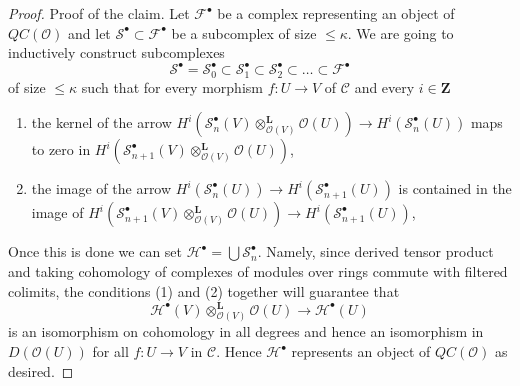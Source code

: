 \begin{proof}
\medskip\noindent
Proof of the claim. Let $\mathcal{F}^\bullet$ be a complex representing
an object of $\mathit{QC}(\mathcal{O})$ and let
$\mathcal{S}^\bullet \subset \mathcal{F}^\bullet$ be a subcomplex of
size $\leq \kappa$. We are going to inductively construct subcomplexes
$$
\mathcal{S}^\bullet = \mathcal{S}_0^\bullet \subset
\mathcal{S}_1^\bullet \subset
\mathcal{S}_2^\bullet \subset \ldots \subset \mathcal{F}^\bullet
$$
of size $\leq \kappa$ such that for every morphism $f : U \to V$
of $\mathcal{C}$ and every $i \in \mathbf{Z}$
\begin{enumerate}
\item the kernel of the arrow
$H^i(\mathcal{S}_n^\bullet(V)
\otimes_{\mathcal{O}(V)}^\mathbf{L} \mathcal{O}(U)) \to
H^i(\mathcal{S}_n^\bullet(U))$
maps to zero in
$H^i(\mathcal{S}_{n + 1}^\bullet(V)
\otimes_{\mathcal{O}(V)}^\mathbf{L} \mathcal{O}(U))$,
\item the image of the arrow
$H^i(\mathcal{S}_n^\bullet(U)) \to H^i(\mathcal{S}_{n + 1}^\bullet(U))$
is contained in the image of
$H^i(\mathcal{S}_{n + 1}^\bullet(V)
\otimes_{\mathcal{O}(V)}^\mathbf{L} \mathcal{O}(U)) \to
H^i(\mathcal{S}_{n + 1}^\bullet(U))$,
\end{enumerate}
Once this is done we can set
$\mathcal{H}^\bullet = \bigcup \mathcal{S}_n^\bullet$.
Namely, since derived tensor product and taking cohomology of
complexes of modules over rings commute with filtered
colimits, the conditions (1) and (2) together will guarantee
that
$$
\mathcal{H}^\bullet(V) \otimes_{\mathcal{O}(V)}^\mathbf{L} \mathcal{O}(U)
\longrightarrow
\mathcal{H}^\bullet(U)
$$
is an isomorphism on cohomology in all degrees and hence an isomorphism
in $D(\mathcal{O}(U))$ for all $f : U \to V$ in $\mathcal{C}$.
Hence $\mathcal{H}^\bullet$ represents an object of
$\mathit{QC}(\mathcal{O})$ as desired.


\end{proof}
